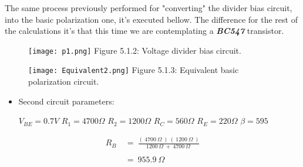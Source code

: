 \pagebreak

The same process previously performed for "converting" the divider bias circuit, into the basic polarization one, it's executed bellow. The difference for the rest of the calculations it's that this time we are contemplating a {\bfseries\itshape BC547} transistor.

\begin{multicols}{2}
\begin{figure}[H]
\texttt{[image: p1.png]}
\centering \linebreak \linebreak Figure 5.1.2: Voltage divider bias circuit.
\end{figure}

\begin{figure}[H]
\texttt{[image: Equivalent2.png]}
\centering \linebreak \linebreak Figure 5.1.3: Equivalent basic polarization circuit.
\end{figure}
\end{multicols} \hfill

\setcounter{equation}{0}

{\bfseries
\begin{itemize}
\item Second circuit parameters:
\begin{tasks}
\task $V_{BE} =  0.7 V$
\task $R_{1} = 4700 \Omega$
\task $R_{2} = 1200 \Omega$
\task $R_{C} = 560 \Omega$
\task $R_{E} = 220 \Omega$
\task $\beta = 595 $
\end{tasks}
\end{itemize}} \hfill \break

{\bfseries\itshape{}} 

\begin{flushright}
{\bfseries\itshape{}} \hfill \break
\end{flushright}

\begin{ceqn}
\begin{align}
R_{B}\ &=\ \frac{(\ 4700\ \Omega\ )\ (\ 1200\ \Omega\ )}{1200\ \Omega\ +\ 4700\ \Omega\ } \\ \\
&=\ 955.9\ \Omega
\end{align}
\end{ceqn} \pagebreak

